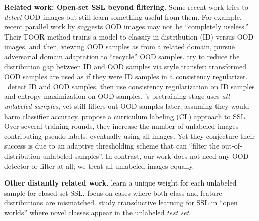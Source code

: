 \textbf{Related work: Open-set SSL beyond filtering.}
Some recent work tries to \emph{detect} OOD images but still learn something useful from them.
For example, recent parallel work by
\citet{huangTheyAreNot2022} suggests OOD images may not be ``completely useless.''
Their TOOR method trains a model to classify in-distribution (ID) versus OOD images, and then, viewing OOD samples as from a related domain, pursue adversarial domain adaptation to ``recycle'' OOD samples.
\citet{luoEmpiricalStudyAnalysis2021} try to reduce the distribution gap between ID and OOD samples via style transfer:
transformed OOD samples are used as if they were ID samples in a consistency regularizer.
\citet{banitalebi2022auxmix}~detect ID and OOD samples, then use consistency regularization on ID samples and entropy maximization on OOD samples. 
\citet{huangTrashTreasureHarvesting2021}'s pretraining stage uses \emph{all unlabeled samples}, yet still filters out OOD samples later, assuming they would harm classifier accuracy.
\citet{cascante-bonillaCurriculumLabelingRevisiting2021} propose a curriculum labeling (CL) approach to SSL.
Over several training rounds, they increase the number of unlabeled images contributing pseudo-labels, eventually using all images.
Yet they conjecture their success is due to an
adaptive thresholding scheme  that can ``filter the out-of-distribution unlabeled samples''.
In contrast, our work does not need any OOD detector or filter at all; we treat all unlabeled images equally.


\textbf{Other distantly related work.} 
\citet{ren2020not} learn a unique weight for each unlabeled sample for closed-set SSL. \citet{huangUniversalSemiSupervisedLearning2021} focus on cases where both class and feature distributions are mismatched.
\citet{caoOpenworldSemisupervisedLearning2022} study transductive learning for SSL in ``open worlds'' where novel classes appear in the unlabeled \emph{test set}.


